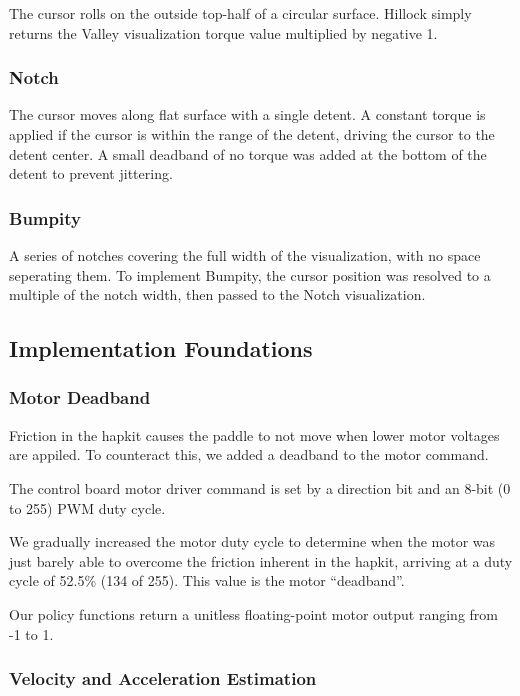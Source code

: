 \documentclass{article}
\begin{document}
    The cursor rolls on the outside top-half of a circular surface.
    Hillock simply returns the Valley visualization torque value multiplied by negative 1.

  \subsubsection{Notch}

    The cursor moves along flat surface with a single detent.
    A constant torque is applied if the cursor is within the range of the
    detent, driving the cursor to the detent center. A small deadband of no
    torque was added at the bottom of the detent to prevent jittering.

  \subsubsection{Bumpity}

    A series of notches covering the full width of the visualization, with no
    space seperating them.
    To implement Bumpity, the cursor position was resolved to a multiple of the
    notch width, then passed to the Notch visualization.

\subsection{Implementation Foundations}

  \subsubsection{Motor Deadband}
    Friction in the hapkit causes the paddle to not move when lower motor voltages
    are appiled. To counteract this, we added a deadband to the motor command.

    The control board motor driver command is set by a direction bit and an
    8-bit (0 to 255) PWM duty cycle.

    We gradually increased the  motor duty cycle to determine when the motor was
    just barely able to overcome the friction inherent in the hapkit, arriving at a duty cycle of 52.5\% (134 of 255).
    This value is the motor ``deadband''.

    Our policy functions return a unitless floating-point motor output ranging from -1 to 1.

  \subsubsection{Velocity and Acceleration Estimation}
\end{document}
